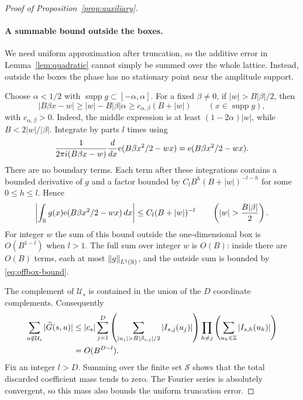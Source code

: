 \begin{proof}[Proof of Proposition~\ref{prop:auxiliary}]
\paragraph{A summable bound outside the boxes.}
We need uniform approximation after truncation, so the additive error
in Lemma~\ref{lem:quadratic} cannot simply be summed over the whole
lattice.  Instead, outside the boxes the phase has no stationary
point near the amplitude support.

Choose $\alpha<1/2$ with $\operatorname{supp}g\subset[-\alpha,\alpha]$.
For a fixed $\beta\ne0$, if $|w|>B|\beta|/2$, then
\begin{equation}
 \label{eq:offbox-derivative}
 |B\beta x-w|\ge |w|-B|\beta|\alpha
 \ge c_{\alpha,\beta}(B+|w|)
 \qquad(x\in\operatorname{supp}g),
\end{equation}
with $c_{\alpha,\beta}>0$.  Indeed, the middle expression is at
least $(1-2\alpha)|w|$, while $B<2|w|/|\beta|$.
Integrate by parts $l$ times using
\[
 \frac{1}{2\pi i(B\beta x-w)}\frac{d}{dx}
   \mathrm e(B\beta x^2/2-wx)=\mathrm e(B\beta x^2/2-wx).
\]
There are no boundary terms.  Each term after these integrations
contains a bounded derivative of $g$ and a factor bounded by
$C_l B^h(B+|w|)^{-l-h}$ for some $0\le h\le l$.  Hence
\begin{equation}
 \label{eq:offbox-bound}
 \left|\int_{\R}g(x)\e(B\beta x^2/2-wx)\,dx\right|
 \le C_l(B+|w|)^{-l}
 \qquad\left(|w|>\frac{B|\beta|}{2}\right).
\end{equation}
For integer $w$ the sum of this bound outside the one-dimensional
box is $O(B^{1-l})$ when $l>1$.  The full sum over integer $w$ is
$O(B)$: inside there are $O(B)$ terms, each at most $\left\lVert g\right\rVert_{L^1(\mathbb R)}$,
and the outside sum is bounded by \eqref{eq:offbox-bound}.

The complement of $\mathcal U_s$ is contained in the union of the
$D$ coordinate complements.  Consequently
\begin{align}
 \sum_{u\notin\mathcal U_s}|\widehat G(s,u)|
 &\le |c_s|\sum_{j=1}^D
 \left(\sum_{|u_j|>B|\beta_{s,j}|/2}|I_{s,j}(u_j)|\right)
 \prod_{h\ne j}\left(\sum_{u_h\in\Z}|I_{s,h}(u_h)|\right)
 \notag\\
 &=O(B^{D-l}).
 \label{eq:spread-tail}
\end{align}
Fix an integer $l>D$.  Summing over the finite set $\mathcal S$
shows that the total discarded coefficient mass tends to zero.
The Fourier series is absolutely convergent, so this mass also
bounds the uniform truncation error.


\end{proof}
